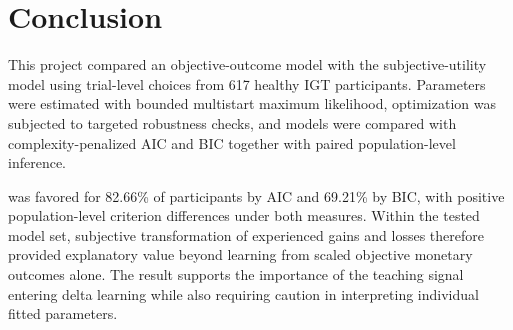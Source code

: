 \section{Conclusion}

This project compared an objective-outcome \QL{} model with the subjective-utility \PVL{} model using trial-level choices from 617 healthy IGT participants. Parameters were estimated with bounded multistart maximum likelihood, optimization was subjected to targeted robustness checks, and models were compared with complexity-penalized AIC and BIC together with paired population-level inference.

\PVL{} was favored for 82.66\% of participants by AIC and 69.21\% by BIC, with positive population-level criterion differences under both measures. Within the tested model set, subjective transformation of experienced gains and losses therefore provided explanatory value beyond learning from scaled objective monetary outcomes alone. The result supports the importance of the teaching signal entering delta learning while also requiring caution in interpreting individual fitted parameters.
